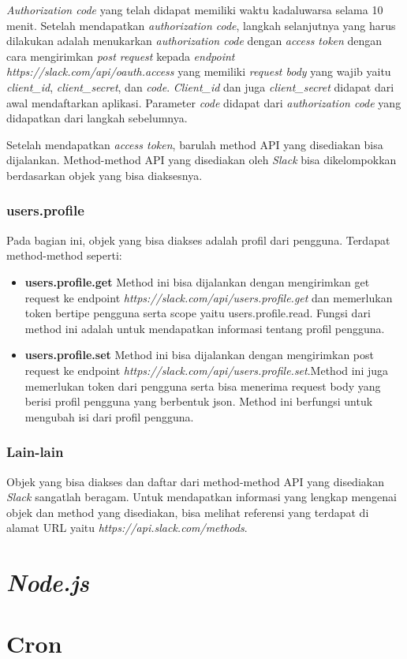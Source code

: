 \textit{Authorization code} yang telah didapat memiliki waktu kadaluwarsa selama 10 menit. Setelah mendapatkan \textit{authorization code}, langkah selanjutnya yang harus dilakukan adalah menukarkan \textit{authorization code} dengan \textit{access token} dengan cara mengirimkan \textit{post request} kepada \textit{endpoint} \textit{https://slack.com/api/oauth.access} yang memiliki \textit{request body} yang wajib yaitu \textit{client\_id}, \textit{client\_secret}, dan \textit{code}. \textit{Client\_id} dan juga \textit{client\_secret} didapat dari awal mendaftarkan aplikasi. Parameter \textit{code} didapat dari \textit{authorization code} yang didapatkan dari langkah sebelumnya.

Setelah mendapatkan \textit{access token}, barulah method API yang disediakan bisa dijalankan. Method-method API yang disediakan oleh \textit{Slack} bisa dikelompokkan berdasarkan objek yang bisa diaksesnya.  

\subsubsection{users.profile}
Pada bagian ini, objek yang bisa diakses adalah profil dari pengguna. Terdapat method-method seperti:
\begin{itemize}
	\item \textbf{users.profile.get}
	Method ini bisa dijalankan dengan mengirimkan get request ke endpoint \textit{https://slack.com/api/users.profile.get} dan memerlukan token bertipe pengguna serta scope yaitu users.profile.read. Fungsi dari method ini adalah untuk mendapatkan informasi tentang profil pengguna. 
	\item \textbf{users.profile.set}
	Method ini bisa dijalankan dengan mengirimkan post request ke endpoint \textit{	https://slack.com/api/users.profile.set}.Method ini juga memerlukan token dari pengguna serta bisa menerima request body yang berisi profil pengguna yang berbentuk json. Method ini berfungsi untuk mengubah isi dari profil pengguna. 
\end{itemize}


\subsubsection{Lain-lain}
Objek yang bisa diakses dan daftar dari method-method API yang disediakan \textit{Slack} sangatlah beragam. Untuk mendapatkan informasi yang lengkap mengenai objek dan method yang disediakan, bisa melihat referensi yang terdapat di alamat URL yaitu \textit{https://api.slack.com/methods}. 


\section{\textit{Node.js}}
\label{sec:nodejs}


\section{Cron}
\label{sec:cron}
 
